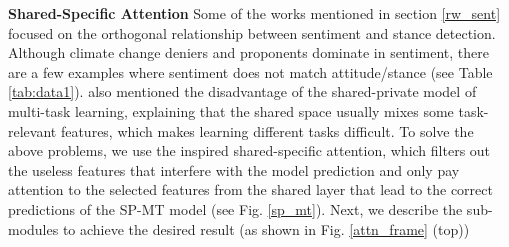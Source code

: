\documentclass[letterpaper]{article} %
\begin{document}
\par \noindent \textbf{Shared-Specific Attention}\label{sharedattn_section} Some of the works mentioned in section \ref{rw_sent} focused on the orthogonal relationship between sentiment and stance detection. Although climate change deniers and proponents dominate in sentiment, there are a few examples where sentiment does not match attitude/stance (see Table \ref{tab:data1}). \cite{wu2019different} also mentioned the disadvantage of the shared-private model of multi-task learning, explaining that the shared space usually mixes some task-relevant features, which makes learning different tasks difficult. %
To solve the above problems, we use the \cite{wu2019different} inspired shared-specific attention, which filters out the useless features that interfere with the model prediction and only pay attention to the selected features from the shared layer that lead to the correct predictions of the SP-MT model (see Fig. \ref{sp_mt}). Next, we describe the sub-modules to achieve the desired result (as shown in Fig. \ref{attn_frame} (top))
\end{document}
